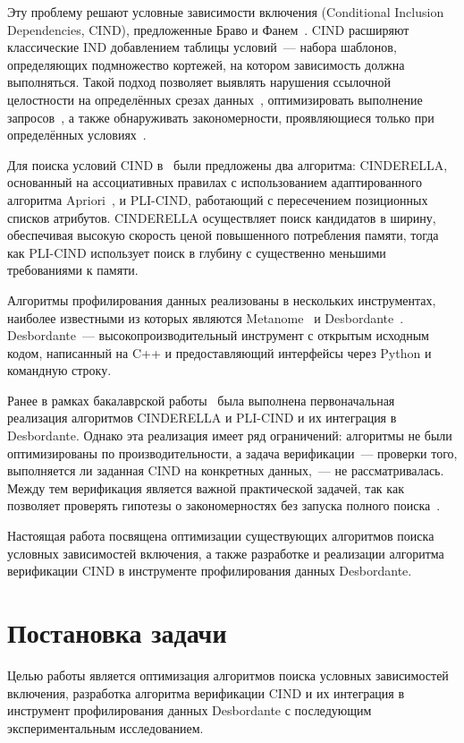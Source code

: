 Эту проблему решают условные зависимости включения (Conditional Inclusion Dependencies, CIND), предложенные Браво и Фанем~\cite{bravo2007extending}. CIND расширяют классические IND добавлением таблицы условий~--- набора шаблонов, определяющих подмножество кортежей, на котором зависимость должна выполняться. Такой подход позволяет выявлять нарушения ссылочной целостности на определённых срезах данных~\cite{fan2008conditional, brink2012cind}, оптимизировать выполнение запросов~\cite{golab2008generating}, а также обнаруживать закономерности, проявляющиеся только при определённых условиях~\cite{chiang2008discovering}.

Для поиска условий CIND в~\cite{brink2012cind} были предложены два алгоритма: CINDERELLA, основанный на ассоциативных правилах с использованием адаптированного алгоритма Apriori~\cite{agrawal1994fast}, и PLI-CIND, работающий с пересечением позиционных списков атрибутов. CINDERELLA осуществляет поиск кандидатов в ширину, обеспечивая высокую скорость ценой повышенного потребления памяти, тогда как PLI-CIND использует поиск в глубину с существенно меньшими требованиями к памяти.

Алгоритмы профилирования данных реализованы в нескольких инструментах, наиболее известными из которых являются Metanome~\cite{papenbrock2015data} и Desbordante~\cite{smirnov2025desbordante}. Desbordante~--- высокопроизводительный инструмент с открытым исходным кодом, написанный на C++ и предоставляющий интерфейсы через Python и командную строку.

Ранее в рамках бакалаврской работы~\cite{abrosimov2025cinderella} была выполнена первоначальная реализация алгоритмов CINDERELLA и PLI-CIND и их интеграция в Desbordante. Однако эта реализация имеет ряд ограничений: алгоритмы не были оптимизированы по производительности, а задача верификации~--- проверки того, выполняется ли заданная CIND на конкретных данных,~--- не рассматривалась. Между тем верификация является важной практической задачей, так как позволяет проверять гипотезы о закономерностях без запуска полного поиска~\cite{papenbrock2016functional, bleifuss2024efficient}.

Настоящая работа посвящена оптимизации существующих алгоритмов поиска условных зависимостей включения, а также разработке и реализации алгоритма верификации CIND в инструменте профилирования данных Desbordante.

\section{Постановка задачи}
\label{sec:task}
Целью работы является оптимизация алгоритмов поиска условных зависимостей включения, разработка алгоритма верификации CIND и их интеграция в инструмент профилирования данных Desbordante с последующим экспериментальным исследованием.

